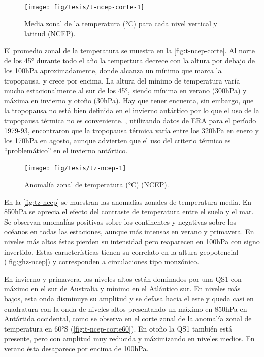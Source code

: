 \documentclass[spanish,a4paper,12pt,oneside]{book}
\begin{document}
\begin{figure}
\texttt{[image: fig/tesis/t-ncep-corte-1]} \caption{Media zonal de la temperatura (°C) para cada nivel vertical y latitud (NCEP).}\label{fig:t-ncep-corte}
\end{figure}

El promedio zonal de la temperatura se muestra en la
\autoref{fig:t-ncep-corte}. Al norte de los 45° durante todo el año la
tempertura decrece con la altura por debajo de los 100hPa
aproximadamente, donde alcanza un mínimo que marca la tropopausa, y
crece por encima. La altura del mínimo de temperatura varía mucho
estacionalmente al sur de los 45°, siendo mínima en verano (300hPa) y
máxima en invierno y otoño (30hPa). Hay que tener encuenta, sin embargo,
que la tropopausa no está bien definida en el invierno antártico
\autocite[ \textcite{Zangl2001}]{Court1942} por lo que el uso de la
tropopausa térmica no es conveniente. \textcite{Zangl2001}, utilizando
datos de ERA para el período 1979-93, encontraron que la tropopausa
térmica varía entre los 320hPa en enero y los 170hPa en agosto, aunque
advierten que el uso del criterio térmico es ``problemático'' en el
invierno antártico.

\begin{landscape}\begin{figure}

{\centering \texttt{[image: fig/tesis/tz-ncep-1]} 

}

\caption{Anomalía zonal de temperatura (°C) (NCEP).}\label{fig:tz-ncep}
\end{figure}
\end{landscape}

En la \autoref{fig:tz-ncep} se muestran las anomalías zonales de
temperatura media. En 850hPa se aprecia el efecto del contraste de
temperatura entre el suelo y el mar. Se observan anomalías positivas
sobre los continentes y negativas sobre los océanos en todas las
estaciones, aunque más intensas en verano y primavera. En niveles más
altos éstas pierden su intensidad pero reaparecen en 100hPa con signo
invertido. Estas características tienen su correlato en la altura
geopotencial (\autoref{fig:ghz-ncep}) y corresponden a circulaciones
tipo monzónico.

En invierno y primavera, los niveles altos están dominados por una QS1
con máximo en el sur de Australia y mínimo en el Atlántico sur. En
niveles más bajos, esta onda disminuye su amplitud y se defasa hacia el
este y queda casi en cuadratura con la onda de niveles altos presentando
un máximo en 850hPa en Antártida occidental, como se observa en el corte
zonal de la anomalía zonal de temperatura en 60°S
(\autoref{fig:t-ncep-corte60}). En otoño la QS1 también está presente,
pero con amplitud muy reducida y máximizando en niveles medios. En
verano ésta desaparece por encima de 100hPa.
\end{document}
